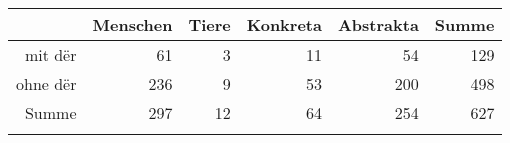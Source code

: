 \begin{tabular}{rrrrrr}
  \lsptoprule
 & Menschen & Tiere & Konkreta & Abstrakta & Summe \\ 
  \midrule
mit dër & 61 & 3 & 11 & 54 & 129 \\ 
  ohne dër & 236 & 9 & 53 & 200 & 498 \\ 
  Summe & 297 & 12 & 64 & 254 & 627 \\ 
   \lspbottomrule
\end{tabular}
